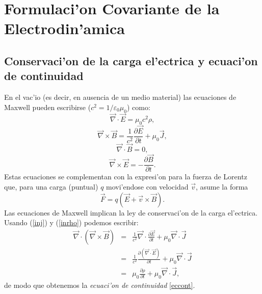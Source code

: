 \chapter{Formulaci'on Covariante de la Electrodin'amica}

\section{Conservaci'on de la carga el'ectrica y ecuaci'on de continuidad}\label{ccer}

En el vac'io (es decir, en ausencia de un medio material) las ecuaciones de Maxwell pueden escribirse ($c^2=1/\varepsilon_0\mu_0$) como:
\begin{equation}\label{inrho}
\vec{\nabla}\cdot \vec{E} = \mu_0 c^2\rho ,
\end{equation}
\begin{equation}\label{inj}
\vec{\nabla}\times \vec{B} = \frac{1}{c^2} \frac{\partial \vec{E}}{\partial t} +\mu_0\vec{J} ,
\end{equation}
\begin{equation}\label{db0}
\vec{\nabla}\cdot \vec{B} =0 ,
\end{equation}
\begin{equation}\label{de+}
\vec{\nabla}\times \vec{E} = - \frac{\partial \vec{B}}{\partial t} .
\end{equation}
Estas ecuaciones se complementan con la expresi'on para la fuerza de Lorentz que, para una carga (puntual) $q$ movi'endose con velocidad $\vec{v}$, asume la forma
\begin{equation}
\vec{F} = q \left( \vec{E} + \vec{v}\times \vec{B}\right) .
\end{equation}
Las ecuaciones de Maxwell implican la ley de conservaci'on de la carga el'ectrica. Usando (\ref{inj}) y (\ref{inrho}) podemos escribir:
\begin{eqnarray}
\vec{\nabla}\cdot (\vec{\nabla}\times \vec{B}) &=& \frac{1}{c^2} \vec{\nabla}\cdot\frac{\partial \vec{E}}{\partial t} + \mu_0 \vec{\nabla}\cdot \vec{J}\\
 &=& \frac{1}{c^2} \frac{\partial (\vec{\nabla}\cdot \vec{E})}{\partial t} +
\mu_0 \vec{\nabla}\cdot \vec{J}\\
&=&\mu_0\frac{\partial \rho}{\partial t} + \mu_0
\vec{\nabla}\cdot \vec{J} ,
\end{eqnarray}
de modo que obtenemos la \textit{ecuaci'on de continuidad} \eqref{eccont}.

